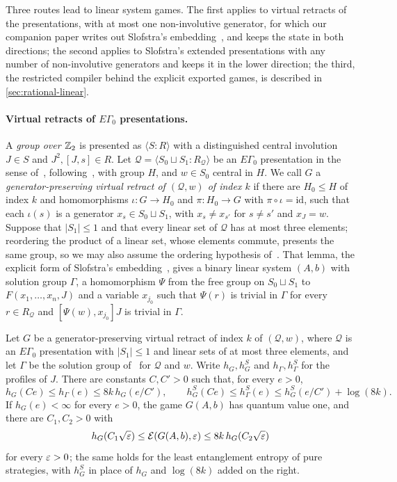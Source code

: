 Three routes lead to linear system games. The first applies to virtual retracts of the presentations, with at most one
non-involutive generator, for which our companion paper writes out Slofstra's embedding~\cite[Appendix~B]{DM-game}, and keeps
the state in both directions; the second applies to Slofstra's extended presentations with any number of non-involutive
generators and keeps it in the lower direction; the third, the restricted compiler behind the explicit exported games, is
described in \cref{sec:rational-linear}.

\paragraph{Virtual retracts of $E\Gamma_0$ presentations.} A \emph{group over $\mathbb Z_2$} is presented as $\langle S:R\rangle$ with a
distinguished central involution $J\in S$ and $J^2,[J,s]\in R$. Let $\mathcal Q=\langle S_0\sqcup S_1:R_{\mathcal Q}\rangle$ be an
$E\Gamma_0$ presentation in the sense of~\cite[Definition~10.1]{DM-game}, following~\cite[Definition~4.7]{Slo19}, with group $H$,
and $w\in S_0$ central in $H$. We call $G$ a \emph{generator-preserving virtual retract of $(\mathcal Q,w)$ of index $k$} if there
are $H_0\le H$ of index $k$ and homomorphisms $\iota:G\to H_0$ and $\pi:H_0\to G$ with $\pi\circ\iota=\mathrm{id}$, such that each
$\iota(s)$ is a generator $x_s\in S_0\sqcup S_1$, with $x_s\ne x_{s'}$ for $s\ne s'$ and $x_J=w$. Suppose that $|S_1|\le1$ and that
every linear set of $\mathcal Q$ has at most three elements; reordering the product of a linear set, whose elements commute,
presents the same group, so we may also assume the ordering hypothesis of~\cite[Lemma~B.1]{DM-game}. That lemma, the explicit
form of Slofstra's embedding~\cite[Section~4]{Slo19}, gives a binary linear system $(A,b)$ with solution group $\Gamma$, a
homomorphism $\Psi$ from the free group on $S_0\sqcup S_1$ to $F(x_1,\dots,x_n,J)$ and a variable $x_{j_0}$ such that $\Psi(r)$
is trivial in $\Gamma$ for every $r\in R_{\mathcal Q}$ and $[\Psi(w),x_{j_0}]J$ is trivial in $\Gamma$.

\begin{theorem}\label{thm:compile}
Let $G$ be a generator-preserving virtual retract of index $k$ of $(\mathcal Q,w)$, where $\mathcal Q$ is an $E\Gamma_0$
presentation with $|S_1|\le1$ and linear sets of at most three elements, and let $\Gamma$ be the solution group
of~\cite[Lemma~B.1]{DM-game} for $\mathcal Q$ and $w$.
Write $h_G,h^S_G$ and $h_\Gamma,h^S_\Gamma$ for the profiles of $J$. There are constants $C,C'>0$ such that, for every $e>0$,
\[
h_G(Ce)\le h_\Gamma(e)\le8k\,h_G(e/C'),\qquad h^S_G(Ce)\le h^S_\Gamma(e)\le h^S_G(e/C')+\log(8k).
\]
If $h_G(e)<\infty$ for every $e>0$, the game $G(A,b)$ has quantum value one, and there are $C_1,C_2>0$ with
\[
h_G(C_1\sqrt{\varepsilon})\le\mathcal E(G(A,b),\varepsilon)\le8k\,h_G(C_2\sqrt{\varepsilon})
\]
for every $\varepsilon>0$; the same holds for the least entanglement entropy of pure strategies, with $h^S_G$ in place of $h_G$ and
$\log(8k)$ added on the right.
\end{theorem}


